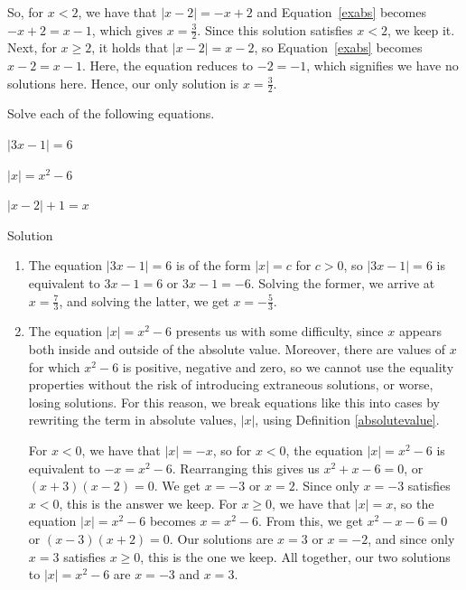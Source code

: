 \begin{example}
\begin{enumerate}
		So, for $x<2$, we have that $|x-2| = -x+2$ and Equation~\eqref{exabs} becomes $-x+2 = x-1$, which gives $x = \frac{3}{2}$.  Since this solution satisfies $x < 2$, we keep it.  Next, for $x \geq 2$, it holds that $|x-2| = x-2$, so Equation~\eqref{exabs} becomes $x-2 = x-1$.  Here, the equation reduces to $-2 = -1$, which signifies we have no solutions here.  Hence, our only solution is $x = \frac{3}{2}$.  
	\end{enumerate}
\end{example}
\fi


\ifvc
\begin{example}
Solve each of the following equations.

\begin{enumerate}
\begin{multicols}{3}
\item  $|3x-1| = 6$
\item  $|x| = x^2-6$
\item  $|x-2| + 1 = x$
\end{multicols}
\end{enumerate}

Solution 

\begin{enumerate}

\item  The equation  $|3x-1| = 6$ is of the form $|x| = c$ for $c>0$, so $|3x-1| = 6$ is equivalent to $3x-1=6$ or $3x-1 = -6$.  Solving the former, we arrive at $x = \frac{7}{3}$, and solving the latter, we get $x = -\frac{5}{3}$.  

\item  The equation  $|x| = x^2-6$ presents us with some difficulty, since $x$ appears both inside and outside of the absolute value. Moreover, there are values of $x$ for which $x^2-6$ is positive, negative and zero, so we cannot use the equality properties without the risk of introducing extraneous solutions, or worse, losing solutions.  For this reason, we break equations like this into cases  by rewriting the term in absolute values, $|x|$, using Definition \ref{absolutevalue}.  

For $x < 0$, we have that $|x| = -x$, so for $x < 0$, the equation $|x| = x^2-6$ is equivalent to $-x = x^2-6$.  Rearranging this gives us $x^2+x-6 = 0$, or $(x+3)(x-2) = 0$.  We get $x = -3$ or $x=2$.  Since only $x=-3$ satisfies $x<0$, this is the answer we keep. For $x \geq 0$, we have that $|x| = x$, so the equation $|x| = x^2-6$ becomes $x = x^2-6$.  From this, we get $x^2-x-6 =0$ or $(x-3)(x+2) = 0$.  Our solutions are $x=3$ or $x = -2$, and since only $x=3$ satisfies $x \geq 0$, this is the one we keep.  All together, our two solutions to $|x| = x^2-6$ are $x=-3$ and $x=3$.


\end{enumerate}
\end{example}
